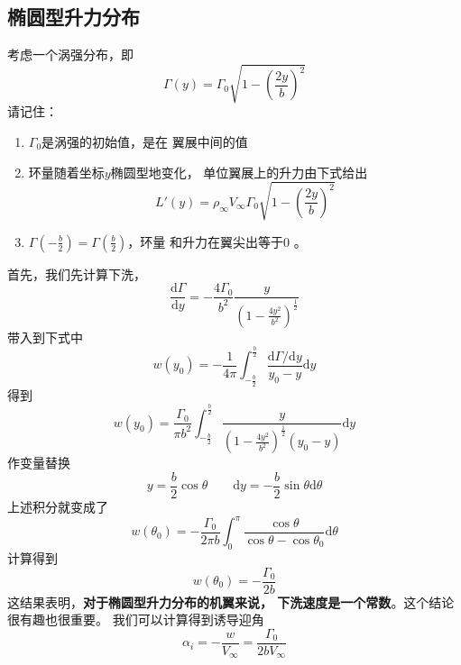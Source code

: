 \subsection{椭圆型升力分布}
考虑一个涡强分布，即
\[
  \Gamma(y)=\Gamma_0
  \sqrt{1-\left(\frac{2y}{b}\right)^2} 
\]
请记住：
\begin{enumerate}
  \item $\Gamma_0$是涡强的初始值，是在
    翼展中间的值
  \item 环量随着坐标$y $椭圆型地变化，
    单位翼展上的升力由下式给出
    \[
      L'(y)=\rho_\infty V_\infty 
      \Gamma_0
      \sqrt{1-\left(\frac{2y}{b }\right)^2} 
    \] 
    \item $\Gamma\left(-\frac{b}{2}\right)= 
      \Gamma\left(\frac{b}{2}\right) $，环量
      和升力在翼尖出等于0 。
\end{enumerate}

首先，我们先计算下洗，
\[
  \frac{\mathrm{d}\Gamma}{\mathrm{d}y}
  =-\frac{4\Gamma_0}{b^2}
  \frac{y}{\left(1-\frac{4y^2}{b^2}\right)^{\frac{1}{2}}}
\]
带入到下式中
\[
  w(y_0)=-\frac{1}{4\pi}
  \int _{-\frac{b}{2}}^{\frac{b}{2}}
  \frac{\mathrm{d}\Gamma / \mathrm{d}y}{y_0-y}\mathrm{d}y
\]
得到
\[
  w(y_0)=\frac{\Gamma_0}{\pi b^2}
  \int _{-\frac{b}{2}}^{\frac{b}{2}}
  \frac{y}{\left(1-\frac{4y^2}{b^2}\right)^{\frac{1}{2}}(y_0-y)}\mathrm{d}y
\]
作变量替换
\[
  y=\frac{b}{2}\cos \theta \qquad \mathrm{d}y=-\frac{b}{2}\sin \theta \mathrm{d}\theta
\]
上述积分就变成了
\[
  w(\theta_0)=-\frac{\Gamma_0}{2 \pi b }
  \int _0 ^\pi \frac{\cos \theta}{\cos \theta-\cos \theta_0}\mathrm{d} \theta
\]
计算得到
\[
  w(\theta_0)=-\frac{\Gamma_0}{2b}
\]
这结果表明，{\color{noteorange}\bfseries 对于椭圆型升力分布的机翼来说，
下洗速度是一个常数}。这个结论很有趣也很重要。
我们可以计算得到诱导迎角
\[
  \alpha_i=-\frac{w }{V_\infty }= \frac{\Gamma_0}{2 b V_\infty}
\]
